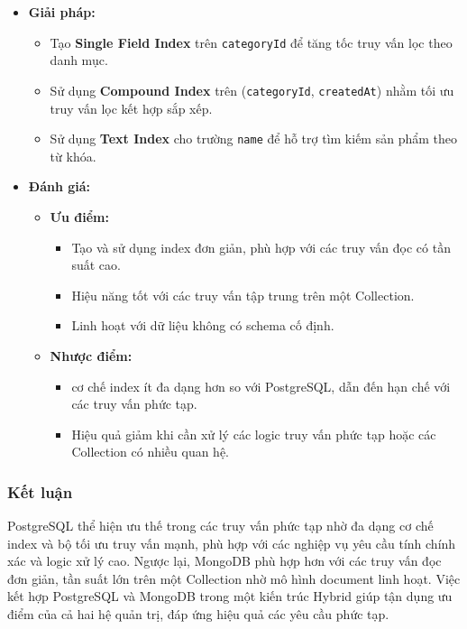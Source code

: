 \begin{itemize}[label=$\circ$]
    \item \textbf{Giải pháp:}
    \begin{itemize}
        \item Tạo \textbf{Single Field Index} trên \texttt{categoryId} để tăng tốc truy vấn lọc theo danh mục.
        \item Sử dụng \textbf{Compound Index} trên (\texttt{categoryId}, \texttt{createdAt}) nhằm tối ưu truy vấn lọc kết hợp sắp xếp.
        \item Sử dụng \textbf{Text Index} cho trường \texttt{name} để hỗ trợ tìm kiếm sản phẩm theo từ khóa.
    \end{itemize}
    
    \item \textbf{Đánh giá:}
    \begin{itemize}
        \item \textbf{Ưu điểm:}
        \begin{itemize}
            \item Tạo và sử dụng index đơn giản, phù hợp với các truy vấn đọc có tần suất cao.
            \item Hiệu năng tốt với các truy vấn tập trung trên một Collection.
            \item Linh hoạt với dữ liệu không có schema cố định.
        \end{itemize}
        
        \item \textbf{Nhược điểm:}
        \begin{itemize}
            \item cơ chế index ít đa dạng hơn so với PostgreSQL, dẫn đến hạn chế với các truy vấn phức tạp.
            \item Hiệu quả giảm khi cần xử lý các logic truy vấn phức tạp hoặc các Collection có nhiều quan hệ.
        \end{itemize}
    \end{itemize}
\end{itemize}

\subsubsection{Kết luận}

PostgreSQL thể hiện ưu thế trong các truy vấn phức tạp nhờ đa dạng cơ chế index và bộ tối ưu truy vấn mạnh, phù hợp với các nghiệp vụ yêu cầu tính chính xác và logic xử lý cao. Ngược lại, MongoDB phù hợp hơn với các truy vấn đọc đơn giản, tần suất lớn trên một Collection nhờ mô hình document linh hoạt. Việc kết hợp PostgreSQL và MongoDB trong một kiến trúc Hybrid giúp tận dụng ưu điểm của cả hai hệ quản trị, đáp ứng hiệu quả các yêu cầu phức tạp.